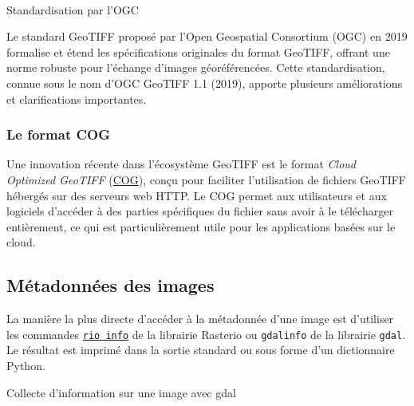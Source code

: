 \documentclass[
  11pt,
  letterpaper,
  open=any,
  twoside=false,
  french]{scrbook}
\makeatletter
\let\oldparagraph\paragraph
\renewcommand{\paragraph}{
    \@ifstar
      \xxxParagraphStar
      \xxxParagraphNoStar
  }
\newcommand{\xxxParagraphStar}[1]{\oldparagraph*{#1}\mbox{}}
\newcommand{\xxxParagraphNoStar}[1]{\oldparagraph{#1}\mbox{}}
\newenvironment{Shaded}{\begin{snugshade}}{\end{snugshade}}
\newcommand{\NormalTok}[1]{\textcolor[rgb]{0.00,0.23,0.31}{#1}}
\newcommand{\OperatorTok}[1]{\textcolor[rgb]{0.37,0.37,0.37}{#1}}
\makeatother
\begin{document}
\paragraph{Standardisation par l'OGC}\label{standardisation-par-logc}

Le standard GeoTIFF proposé par l'Open Geospatial Consortium (OGC) en
2019 formalise et étend les spécifications originales du format GeoTIFF,
offrant une norme robuste pour l'échange d'images géoréférencées. Cette
standardisation, connue sous le nom d'OGC GeoTIFF 1.1 (2019), apporte
plusieurs améliorations et clarifications importantes.

\subsubsection{Le format COG}\label{le-format-cog}

Une innovation récente dans l'écosystème GeoTIFF est le format
\emph{Cloud Optimized GeoTIFF} (\href{http://cogeo.org/}{COG}), conçu
pour faciliter l'utilisation de fichiers GeoTIFF hébergés sur des
serveurs web HTTP. Le COG permet aux utilisateurs et aux logiciels
d'accéder à des parties spécifiques du fichier sans avoir à le
télécharger entièrement, ce qui est particulièrement utile pour les
applications basées sur le cloud.

\subsection{Métadonnées des images}\label{muxe9tadonnuxe9es-des-images}

La manière la plus directe d'accéder à la métadonnée d'une image est
d'utiliser les commandes
\href{https://rasterio.readthedocs.io/en/stable/cli.html\#info}{\texttt{rio\ info}}
de la librairie Rasterio ou \texttt{gdalinfo} de la librairie
\texttt{gdal}. Le résultat est imprimé dans la sortie standard ou sous
forme d'un dictionnaire Python.

\begin{codelisting}

\caption{\label{lst-gdalinfo}Collecte d'information sur une image avec
gdal}

\centering{

\begin{Shaded}
\begin{Highlighting}[]
\OperatorTok{!}\NormalTok{gdalinfo RGBNIR\_of\_S2A.tif}
\end{Highlighting}
\end{Shaded}

}

\end{codelisting}%
\end{document}
